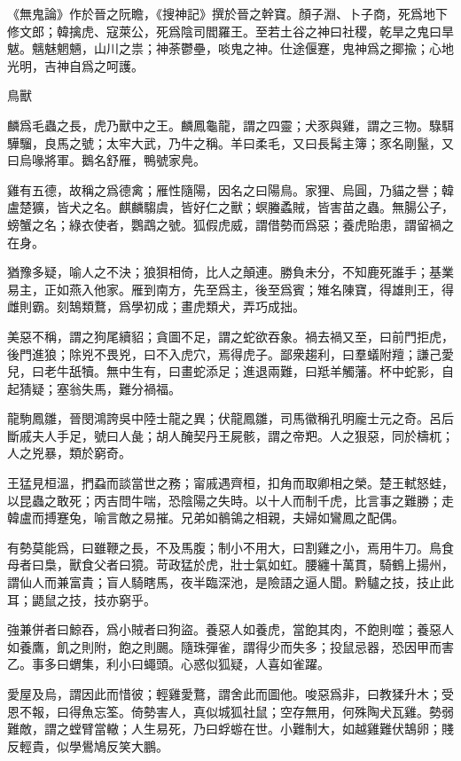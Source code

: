 \documentclass[12pt,a4paper]{ctexbook}
\begin{document}
《無鬼論》作於晉之阮瞻，《搜神記》撰於晉之幹寶。顏子淵、卜子商，死爲地下修文郎；韓擒虎、寇萊公，死爲陰司閻羅王。至若土谷之神曰社稷，乾旱之鬼曰旱魃。魑魅魍魎，山川之祟；神荼鬱壘，啖鬼之神。仕途偃蹇，鬼神爲之揶揄；心地光明，吉神自爲之呵護。\par
鳥獸\par
麟爲毛蟲之長，虎乃獸中之王。麟鳳龜龍，謂之四靈；犬豕與雞，謂之三物。騄駬驊騮，良馬之號；太牢大武，乃牛之稱。羊曰柔毛，又曰長髯主簿；豕名剛鬣，又曰烏喙將軍。鵝名舒雁，鴨號家鳧。\par
雞有五德，故稱之爲德禽；雁性隨陽，因名之曰陽鳥。家狸、烏圓，乃貓之譽；韓盧楚獷，皆犬之名。麒麟騶虞，皆好仁之獸；螟螣蟊賊，皆害苗之蟲。無腸公子，螃蟹之名；綠衣使者，鸚鵡之號。狐假虎威，謂借勢而爲惡；養虎貽患，謂留禍之在身。\par
猶豫多疑，喻人之不決；狼狽相倚，比人之顛連。勝負未分，不知鹿死誰手；基業易主，正如燕入他家。雁到南方，先至爲主，後至爲賓；雉名陳寶，得雄則王，得雌則霸。刻鵠類鶩，爲學初成；畫虎類犬，弄巧成拙。\par
美惡不稱，謂之狗尾續貂；貪圖不足，謂之蛇欲吞象。禍去禍又至，曰前門拒虎，後門進狼；除兇不畏兇，曰不入虎穴，焉得虎子。鄙衆趨利，曰羣蟻附羶；謙己愛兒，曰老牛舐犢。無中生有，曰畫蛇添足；進退兩難，曰羝羊觸藩。杯中蛇影，自起猜疑；塞翁失馬，難分禍福。\par
龍駒鳳雛，晉閔鴻誇吳中陸士龍之異；伏龍鳳雛，司馬徽稱孔明龐士元之奇。呂后斷戚夫人手足，號曰人彘；胡人醃契丹王屍骸，謂之帝羓。人之狠惡，同於檮杌；人之兇暴，類於窮奇。\par
王猛見桓溫，捫蝨而談當世之務；甯戚遇齊桓，扣角而取卿相之榮。楚王軾怒蛙，以昆蟲之敢死；丙吉問牛喘，恐陰陽之失時。以十人而制千虎，比言事之難勝；走韓盧而搏蹇兔，喻言敵之易摧。兄弟如鶺鴒之相親，夫婦如鸞鳳之配偶。\par
有勢莫能爲，曰雖鞭之長，不及馬腹；制小不用大，曰割雞之小，焉用牛刀。鳥食母者曰梟，獸食父者曰獍。苛政猛於虎，壯士氣如虹。腰纏十萬貫，騎鶴上揚州，謂仙人而兼富貴；盲人騎瞎馬，夜半臨深池，是險語之逼人聞。黔驢之技，技止此耳；鼯鼠之技，技亦窮乎。\par
強兼併者曰鯨吞，爲小賊者曰狗盜。養惡人如養虎，當飽其肉，不飽則噬；養惡人如養鷹，飢之則附，飽之則颺。隨珠彈雀，謂得少而失多；投鼠忌器，恐因甲而害乙。事多曰蝟集，利小曰蠅頭。心惑似狐疑，人喜如雀躍。\par
愛屋及烏，謂因此而惜彼；輕雞愛鶩，謂舍此而圖他。唆惡爲非，曰教猱升木；受恩不報，曰得魚忘筌。倚勢害人，真似城狐社鼠；空存無用，何殊陶犬瓦雞。勢弱難敵，謂之螳臂當轍；人生易死，乃曰蜉蝣在世。小難制大，如越雞難伏鵠卵；賤反輕貴，似學鷽鳩反笑大鵬。\par
\end{document}
